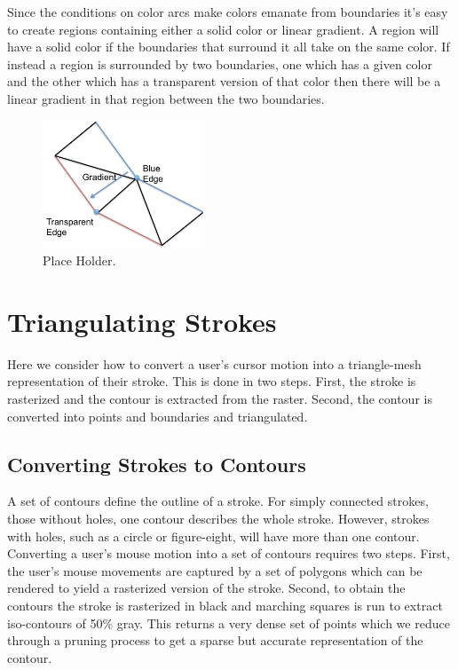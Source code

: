 \documentclass[review]{acmsiggraph}
\begin{document}
Since the conditions on color arcs make colors emanate from boundaries it's easy to create regions
containing either a solid color or linear gradient. A region will have a solid color if the
boundaries that surround it all take on the same color. If instead a region is surrounded by
two boundaries, one which has a given color and the other which has a transparent version of that color
then there will be a linear gradient in that region between the two boundaries.

\begin{figure}
    \centering
        \includegraphics[height=1.5in]{images/softstrokeboundaryedges}
    \caption{Place Holder.}
\end{figure}

\section{Triangulating Strokes}

Here we consider how to convert a user's cursor motion into a triangle-mesh representation
of their stroke. This is done in two steps. First, the stroke is rasterized and the
contour is extracted from the raster. Second, the contour is converted into points and
boundaries and triangulated.

\subsection{Converting Strokes to Contours}
A set of contours define the outline of a stroke. For simply connected strokes, those without holes, 
one contour describes the whole stroke. However, strokes with holes, such as a circle or 
figure-eight, will have more than one contour.
Converting a user's mouse motion into a set of contours requires two steps.
First, the user's mouse movements are captured by a set of polygons which can be
rendered to yield a rasterized version of the stroke.
Second, to obtain the contours the stroke is rasterized in black and marching squares
is run to extract iso-contours of 50\% gray. This returns a very dense set of points 
which we reduce through a pruning process to
get a sparse but accurate representation of the contour.
\end{document}
